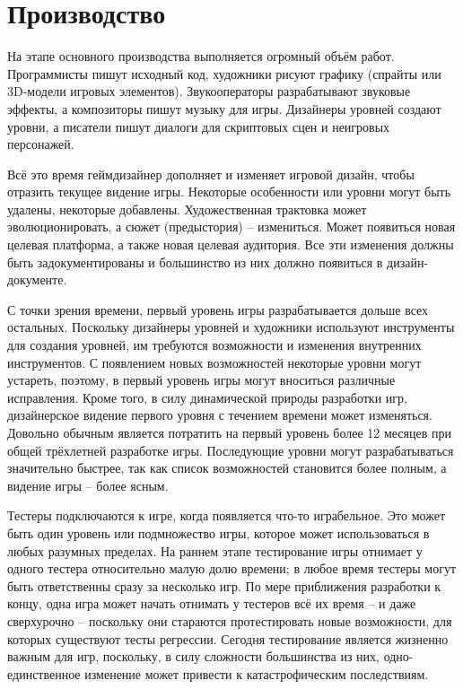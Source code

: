 \section{Производство}

На этапе основного производства выполняется огромный объём работ. Программисты пишут исходный код, художники 
рисуют графику (спрайты или 3D-модели игровых элементов). Звукооператоры разрабатывают звуковые эффекты, а 
композиторы пишут музыку для игры. Дизайнеры уровней создают уровни, а писатели пишут диалоги для скриптовых 
сцен и неигровых персонажей.

Всё это время геймдизайнер дополняет и изменяет игровой дизайн, чтобы отразить текущее видение игры. 
Некоторые особенности или уровни могут быть удалены, некоторые добавлены. Художественная трактовка может 
эволюционировать, а сюжет (предыстория) -- измениться. Может появиться новая целевая платформа, а также 
новая целевая аудитория. Все эти изменения должны быть задокументированы и большинство из них должно 
появиться в дизайн-документе.

С точки зрения времени, первый уровень игры разрабатывается дольше всех остальных. Поскольку дизайнеры 
уровней и художники используют инструменты для создания уровней, им требуются возможности и изменения 
внутренних инструментов. С появлением новых возможностей некоторые уровни могут устареть, поэтому, в первый 
уровень игры могут вноситься различные исправления. Кроме того, в силу динамической природы разработки игр, 
дизайнерское видение первого уровня с течением времени может изменяться. Довольно обычным является потратить 
на первый уровень более 12 месяцев при общей трёхлетней разработке игры. Последующие уровни могут 
разрабатываться значительно быстрее, так как список возможностей становится более полным, а видение 
игры -- более ясным.

Тестеры подключаются к игре, когда появляется что-то играбельное. Это может быть один уровень или 
подмножество игры, которое может использоваться в любых разумных пределах. На раннем этапе тестирование 
игры отнимает у одного тестера относительно малую долю времени; в любое время тестеры могут быть 
ответственны сразу за несколько игр. По мере приближения разработки к концу, одна игра может начать отнимать 
у тестеров всё их время -- и даже сверхурочно -- поскольку они стараются протестировать новые возможности, 
для которых существуют тесты регрессии. Сегодня тестирование является жизненно важным для игр, поскольку, в 
силу сложности большинства из них, одно-единственное изменение может привести к катастрофическим 
последствиям.

